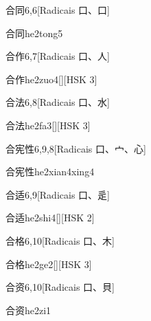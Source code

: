 \begin{entry}{合同}{6,6}[Radicais ⼝、⼝]
  \begin{phonetics}{合同}{he2tong5}
  \end{phonetics}
\end{entry}

\begin{entry}{合作}{6,7}[Radicais ⼝、⼈]
  \begin{phonetics}{合作}{he2zuo4}[][HSK 3]
  \end{phonetics}
\end{entry}

\begin{entry}{合法}{6,8}[Radicais ⼝、⽔]
  \begin{phonetics}{合法}{he2fa3}[][HSK 3]
  \end{phonetics}
\end{entry}

\begin{entry}{合宪性}{6,9,8}[Radicais ⼝、⼧、⼼]
  \begin{phonetics}{合宪性}{he2xian4xing4}
  \end{phonetics}
\end{entry}

\begin{entry}{合适}{6,9}[Radicais ⼝、⾡]
  \begin{phonetics}{合适}{he2shi4}[][HSK 2]
  \end{phonetics}
\end{entry}

\begin{entry}{合格}{6,10}[Radicais ⼝、⽊]
  \begin{phonetics}{合格}{he2ge2}[][HSK 3]
  \end{phonetics}
\end{entry}

\begin{entry}{合资}{6,10}[Radicais ⼝、⾙]
  \begin{phonetics}{合资}{he2zi1}
  \end{phonetics}
\end{entry}

